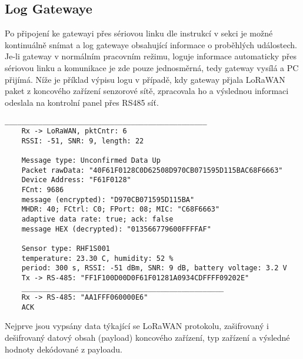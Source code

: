 \newpage
\subsection{Log Gatewaye}
Po připojení ke gatewayi přes sériovou linku dle instrukcí v sekci  je možné kontinuálně snímat a log gatewaye obsahující informace o proběhlých událostech. Je-li gateway v normálním pracovním režimu, loguje informace automaticky přes sériovou linku a komunikace je zde pouze jednosměrná, tedy gateway vysílá a PC přijímá.
Níže je příklad výpisu logu v případě, kdy gateway přjala LoRaWAN paket z koncového zařízení senzorové sítě, zpracovala ho a výslednou informaci odeslala na kontrolní panel přes RS485 síť.

\begin{lstlisting}[style=log]
    ________________________________________________
    Rx -> LoRaWAN, pktCntr: 6
    RSSI: -51, SNR: 9, length: 22

    Message type: Unconfirmed Data Up
    Packet rawData: "40F61F0128C0D62508D970CB071595D115BAC68F6663"
    Device Address: "F61F0128"
    FCnt: 9686
    message (encrypted): "D970CB071595D115BA"
    MHDR: 40; FCtrl: C0; FPort: 08; MIC: "C68F6663"
    adaptive data rate: true; ack: false
    message HEX (decrypted): "013566779600FFFFAF"

    Sensor type: RHF1S001
    temperature: 23.30 C, humidity: 52 %
    period: 300 s, RSSI: -51 dBm, SNR: 9 dB, battery voltage: 3.2 V
    Tx -> RS-485: "FF1F100D00D0F61F01281A0934CDFFFF09202E"
    ________________________________________________
    Rx -> RS-485: "AA1FFF060000E6"
    ACK
\end{lstlisting}

Nejprve jsou vypsány data týkající se LoRaWAN protokolu, zašifrovaný i dešifrovaný datový obsah (payload) koncového zařízení, typ zařízení a výsledné hodnoty dekódované z payloadu.


